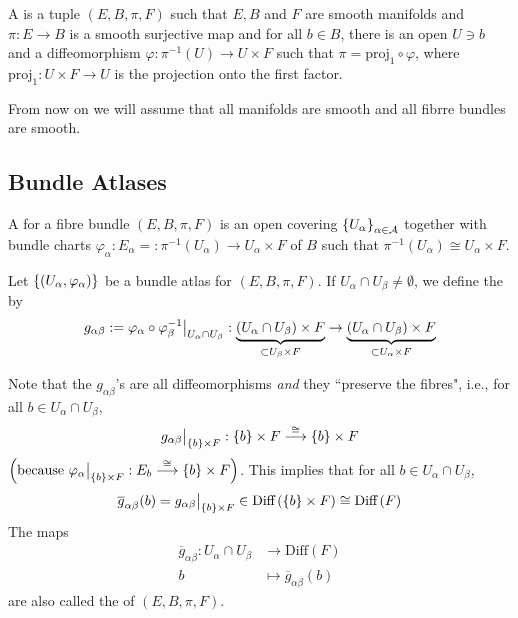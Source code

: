 \documentclass[main.tex]{subfiles}
\begin{document}
\begin{defn}
A  is a tuple $(E, B, \pi, F)$ such that $E, B$ and $F$ are smooth manifolds and $\pi: E \to B$ is a smooth surjective map and for all $b \in B$, there is an open $U \ni b$ and a diffeomorphism $\varphi: \pi^{-1}(U) \to U \times F$ such that $\pi = \text{proj}_1 \circ \varphi$, where $\text{proj}_1 : U \times F \to U$ is the projection onto the first factor.
\end{defn}

\begin{note}
From now on we will assume that all manifolds are smooth and all fibrre bundles are smooth.
\end{note}

\subsection{Bundle Atlases}

\begin{defn}
A  for a fibre bundle $(E, B, \pi, F)$ is an open covering $\left\{ U_\alpha\right\}_{\alpha \in \mathcal{A}}$ together with bundle charts $\varphi_\alpha:  E_\alpha =: \pi^{-1}(U_\alpha) \to U_\alpha \times F$ of $B$ such that $\pi^{-1}(U_\alpha) \cong U_\alpha \times F$.
\end{defn}

\begin{defn}
Let $\left\{ \left( U_\alpha, \varphi_\alpha \right) \right\}$ be a bundle atlas for $(E, B, \pi, F)$. If $U_\alpha \cap U_\beta \neq \emptyset$, we define the  by 
\[
g_{\alpha\beta} := \varphi_\alpha \circ \varphi_\beta^{-1}\big|_{U_\alpha \cap U_\beta} : \underbrace{(U_\alpha \cap U_\beta) \times F}_{\subset U_\beta \times F} \to \underbrace{(U_\alpha \cap U_\beta) \times F}_{\subset U_\alpha \times F}
\] 

\end{defn}

Note that the $g_{\alpha\beta}$'s are all diffeomorphisms {\it and} they ``preserve the fibres", i.e., for all $b \in U_\alpha \cap U_\beta$, 
\[
g_{\alpha\beta}\big|_{\left\{b\right\}\times F}: \left\{b\right\}\times F \overset{\cong}{\longrightarrow} \left\{b\right\}\times F
\]
$\left(  \text{because } \varphi_\alpha \big|_{\left\{b\right\}\times F }: E_b \overset{\cong}{\longrightarrow}\left\{b\right\} \times F \right)$. This implies that for all $b \in U_\alpha \cap U_\beta$, 
\[
\overline{g}_{\alpha\beta}(b) = g_{\alpha\beta}\big|_{\left\{b\right\}\times F} \in \text{Diff}\left( \left\{b\right\}\times F \right) \cong \text{Diff}\left(  F \right) 
\]
The maps
\begin{align*}
    \overline{g}_{\alpha\beta} : U_\alpha \cap U_\beta &\to \text{Diff}(F) \\
                    b &\mapsto \overline{g}_{\alpha\beta}(b)
\end{align*}
are also called the  of $(E,B,\pi, F)$.
\end{document}
